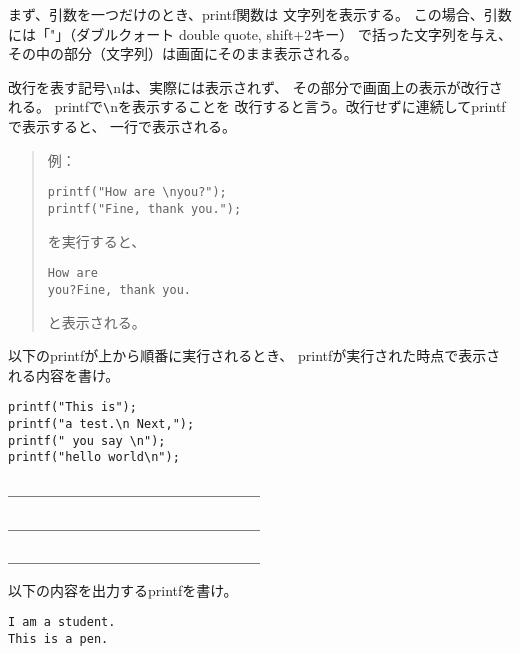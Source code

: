 \documentclass[12pt,a4j]{jarticle}
\newcounter{toi}
\def\toi{%
\bigskip\bigskip\noindent
\addtocounter{toi}{1}
\shadowbox{\bfseries\large 問\thetoi}
\nopagebreak[4]\bigskip\nopagebreak[4]
}
\begin{document}
\toi


まず、引数を一つだけのとき、{\ttfamily printf}関数は
文字列を表示する。
この場合、引数には「{\ttfamily "}」（ダブルクォート double quote, shift+2キー）
で括った文字列を与え、その中の部分（文字列）は画面にそのまま表示される。

改行を表す記号{\ttfamily\verb+\+n}は、実際には表示されず、
その部分で画面上の表示が改行される。
{\ttfamily printf}で{\ttfamily\verb+\+n}を表示することを
改行すると言う。改行せずに連続して{\ttfamily printf}で表示すると、
一行で表示される。


\begin{quote}
例：
\begin{verbatim}
printf("How are \nyou?");
printf("Fine, thank you.");
\end{verbatim}
を実行すると、
\begin{verbatim}
How are 
you?Fine, thank you.
\end{verbatim}
と表示される。
\end{quote}




以下の{\ttfamily printf}が上から順番に実行されるとき、
{\ttfamily printf}が実行された時点で表示される内容を書け。
\begin{multicols}{2}
\begin{verbatim}
printf("This is");
printf("a test.\n Next,");
printf(" you say \n");
printf("hello world\n");
\end{verbatim}

＿＿＿＿＿＿＿＿＿＿＿＿＿＿＿＿＿＿

＿＿＿＿＿＿＿＿＿＿＿＿＿＿＿＿＿＿

＿＿＿＿＿＿＿＿＿＿＿＿＿＿＿＿＿＿

\end{multicols}







\toi


以下の内容を出力する{\ttfamily printf}を書け。
\begin{multicols}{2}
\begin{verbatim}
I am a student.
This is a pen.
\end{verbatim}
\mbox{}


\end{multicols}
\end{document}
